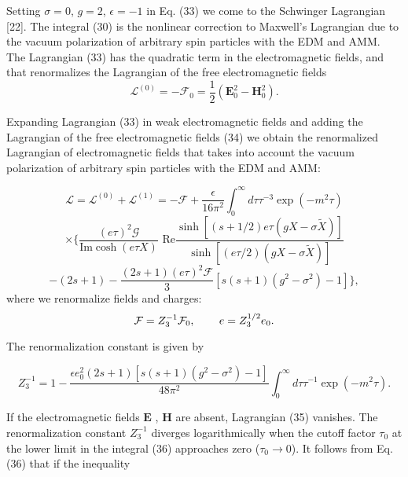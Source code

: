 \documentclass[a4paper,12pt]{article}
\begin{document}
Setting $\sigma =0$, $g=2$, $\epsilon =-1$ in Eq. (33) we come to the
Schwinger Lagrangian [22]. The integral (30) is the nonlinear correction to
Maxwell's Lagrangian due to the vacuum polarization of arbitrary spin
particles with the EDM and AMM. The Lagrangian (33) has the quadratic term
in the electromagnetic fields, and that renormalizes the Lagrangian of the
free electromagnetic fields
\begin{equation}
\mathcal{L}^{(0)}=-\mathcal{F}_0\mathcal{=}\frac 12\left( \mathbf{E}_0^2-
\mathbf{H}_0^2\right).  \label{34}
\end{equation}

Expanding Lagrangian (33) in weak electromagnetic fields and adding the
Lagrangian of the free electromagnetic fields (34) we obtain the
renormalized Lagrangian of electromagnetic fields that takes into account
the vacuum polarization of arbitrary spin particles with the EDM and AMM:

\[
\mathcal{L}=\mathcal{L}^{(0)}+\mathcal{L}^{(1)}=-\mathcal{F}+\frac \epsilon
{16\pi ^2}\int_0^\infty d\tau \tau ^{-3}\exp \left( -m^2\tau \right)
\]
\begin{equation}
\times \biggl \{ \frac{(e\tau )^2\mathcal{G}}{\mbox{Im}\cosh
(e\tau X)}\mbox{ Re}\frac{\sinh \left[ (s+1/2)e\tau \left(
gX-\sigma \widetilde{X}\right) \right] }{\sinh \left[ \left( e\tau
/2\right) \left( gX-\sigma \widetilde{X} \right) \right] }
\label{35}
\end{equation}
\[
-\left( 2s+1\right) -\frac{\left( 2s+1\right) (e\tau )^2\mathcal{F}}3\left[
s(s+1)\left( g^2-\sigma ^2\right) -1\right] \biggl \},
\]
where we renormalize fields and charges:
\[
\mathcal{F}=Z_3^{-1}\mathcal{F}_0,\hspace{0.3in}e=Z_3^{1/2}e_0.
\]

The renormalization constant is given by

\begin{equation}
Z_3^{-1}=1-\frac{\epsilon e_0^2\left( 2s+1\right) \left[ s(s+1)\left(
g^2-\sigma ^2\right) -1\right] }{48\pi ^2}\int_0^\infty d\tau \tau ^{-1}\exp
\left( -m^2\tau \right).  \label{36}
\end{equation}

If the electromagnetic fields $\mathbf{E}$ , $\mathbf{H}$ are absent,
Lagrangian (35) vanishes. The renormalization constant $Z_3^{-1}$ diverges
logarithmically when the cutoff factor $\tau _0$ at the lower limit in the
integral (36) approaches zero ($\tau _0\rightarrow 0$). It follows from Eq.
(36) that if the inequality
\end{document}
